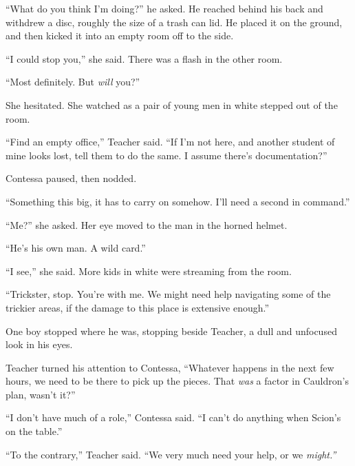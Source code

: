 ``What do you think I'm doing?'' he asked.  He reached behind his back and withdrew a disc, roughly the size of a trash can lid.  He placed it on the ground, and then kicked it into an empty room off to the side.



``I could stop you,'' she said.  There was a flash in the other room.



``Most definitely.  But \emph{will} you?''



She hesitated.  She watched as a pair of young men in white stepped out of the room.



``Find an empty office,'' Teacher said.  ``If I'm not here, and another student of mine looks lost, tell them to do the same.  I assume there's documentation?''



Contessa paused, then nodded.



``Something this big, it has to carry on somehow.  I'll need a second in command.''



``Me?'' she asked.  Her eye moved to the man in the horned helmet.



``He's his own man.  A wild card.''



``I see,'' she said.  More kids in white were streaming from the room.



``Trickster, stop.  You're with me.  We might need help navigating some of the trickier areas, if the damage to this place is extensive enough.''



One boy stopped where he was, stopping beside Teacher, a dull and unfocused look in his eyes.



Teacher turned his attention to Contessa, ``Whatever happens in the next few hours, we need to be there to pick up the pieces.  That \emph{was} a factor in Cauldron's plan, wasn't it?''



``I don't have much of a role,'' Contessa said.  ``I can't do anything when Scion's on the table.''



``To the contrary,'' Teacher said.  ``We very much need your help, or we \emph{might.''}



